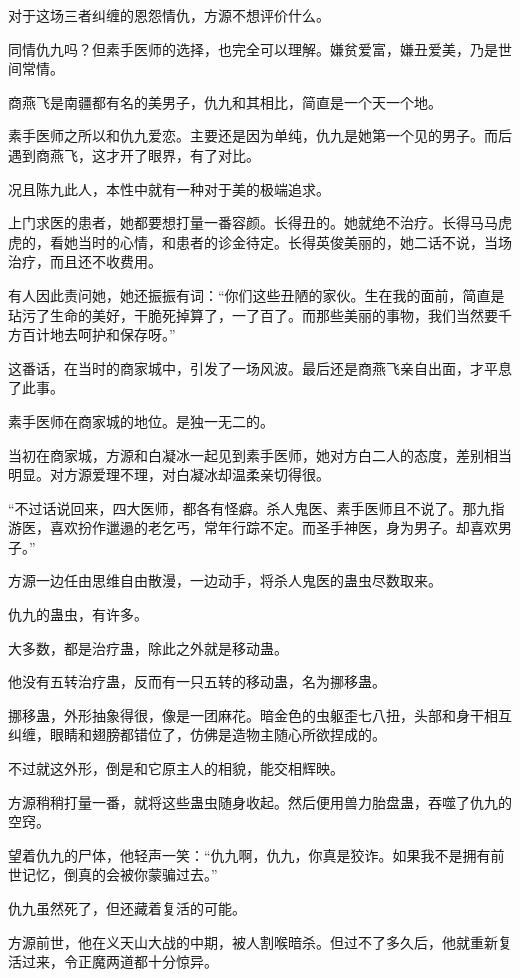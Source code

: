 \begin{this_body}
对于这场三者纠缠的恩怨情仇，方源不想评价什么。

同情仇九吗？但素手医师的选择，也完全可以理解。嫌贫爱富，嫌丑爱美，乃是世间常情。

商燕飞是南疆都有名的美男子，仇九和其相比，简直是一个天一个地。

素手医师之所以和仇九爱恋。主要还是因为单纯，仇九是她第一个见的男子。而后遇到商燕飞，这才开了眼界，有了对比。

况且陈九此人，本性中就有一种对于美的极端追求。

上门求医的患者，她都要想打量一番容颜。长得丑的。她就绝不治疗。长得马马虎虎的，看她当时的心情，和患者的诊金待定。长得英俊美丽的，她二话不说，当场治疗，而且还不收费用。

有人因此责问她，她还振振有词：“你们这些丑陋的家伙。生在我的面前，简直是玷污了生命的美好，干脆死掉算了，一了百了。而那些美丽的事物，我们当然要千方百计地去呵护和保存呀。”

这番话，在当时的商家城中，引发了一场风波。最后还是商燕飞亲自出面，才平息了此事。

素手医师在商家城的地位。是独一无二的。

当初在商家城，方源和白凝冰一起见到素手医师，她对方白二人的态度，差别相当明显。对方源爱理不理，对白凝冰却温柔亲切得很。

“不过话说回来，四大医师，都各有怪癖。杀人鬼医、素手医师且不说了。那九指游医，喜欢扮作邋遢的老乞丐，常年行踪不定。而圣手神医，身为男子。却喜欢男子。”

方源一边任由思维自由散漫，一边动手，将杀人鬼医的蛊虫尽数取来。

仇九的蛊虫，有许多。

大多数，都是治疗蛊，除此之外就是移动蛊。

他没有五转治疗蛊，反而有一只五转的移动蛊，名为挪移蛊。

挪移蛊，外形抽象得很，像是一团麻花。暗金色的虫躯歪七八扭，头部和身干相互纠缠，眼睛和翅膀都错位了，仿佛是造物主随心所欲捏成的。

不过就这外形，倒是和它原主人的相貌，能交相辉映。

方源稍稍打量一番，就将这些蛊虫随身收起。然后便用兽力胎盘蛊，吞噬了仇九的空窍。

望着仇九的尸体，他轻声一笑：“仇九啊，仇九，你真是狡诈。如果我不是拥有前世记忆，倒真的会被你蒙骗过去。”

仇九虽然死了，但还藏着复活的可能。

方源前世，他在义天山大战的中期，被人割喉暗杀。但过不了多久后，他就重新复活过来，令正魔两道都十分惊异。


\end{this_body}
